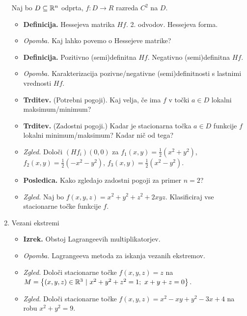 \begin{enumerate}
    Naj bo $D \subseteq \mathbb{R}^n$ odprta, $f: D \to R$ razreda $C^2$ na $D$.
    \begin{itemize}
        \item \colorbox{purple!30}{\textbf{Definicija.}} Hessejeva matrika $Hf$. 2. odvodov. Hessejeva forma.
        \item \colorbox{yellow!30}{\emph{Opomba.}} Kaj lahko povemo o Hessejeve matrike?
        \item \colorbox{purple!30}{\textbf{Definicija.}} Pozitivno (semi)definitna $Hf$. Negativno (semi)definitna $Hf$.
        \item \colorbox{yellow!30}{\emph{Opomba.}} Karakterizacija pozivne/negativne (semi)definitnosti s lastnimi vrednosti $Hf$.
        \item \colorbox{blue!30}{\textbf{Trditev.}} (Potrebni pogoji). Kaj velja, če ima $f$ v točki $a \in D$ lokalni maksimum/minimum?
        \item \colorbox{blue!30}{\textbf{Trditev.}} (Zadostni pogoji.) Kadar je stacionarna točka $a \in D$ funkcije $f$ lokalni minimum/maksimum? Kadar nič od tega?
        \item \colorbox{yellow!30}{\emph{Zgled.}} Določi $(Hf_i)(0,0)$ za $f_1(x,y) = \frac{1}{2}(x^2+y^2)$, $f_2(x,y) = \frac{1}{2}(-x^2-y^2)$, $f_3(x,y) = \frac{1}{2}(x^2-y^2)$.
        \item \colorbox{orange!30}{\textbf{Posledica.}} Kako zgledajo zadostni pogoji za primer $n = 2$?
        \item \colorbox{yellow!30}{\emph{Zgled.}} Naj bo $f(x,y,z) = x^2+y^2+z^2 + 2xyz$. Klasificiraj vse stacionarne točke funkcije $f$.
    \end{itemize}

    \item Vezani ekstremi
    
    \begin{itemize}
        \item \colorbox{blue!30}{\textbf{Izrek.}} Obstoj Lagrangeevih multiplikatorjev.
        \item \colorbox{yellow!30}{\emph{Opomba.}} Lagrangeeva metoda za iskanja vezanih ekstremov.
        \item \colorbox{yellow!30}{\emph{Zgled.}} Določi stacionarne točke $f(x,y,z)=z$ na $M = \left\{(x,y,z) \in \mathbb{R}^3 \ | \ x^2+y^2+z^2=1; \ x+ y + z = 0\right\}$.
        \item \colorbox{yellow!30}{\emph{Zgled.}} Določi stacionarne točke  $f(x,y,z)= x^2 - xy +y^2 - 3x +4$ na robu $x^2 + y^2 = 9$. 
    \end{itemize}
\end{enumerate}